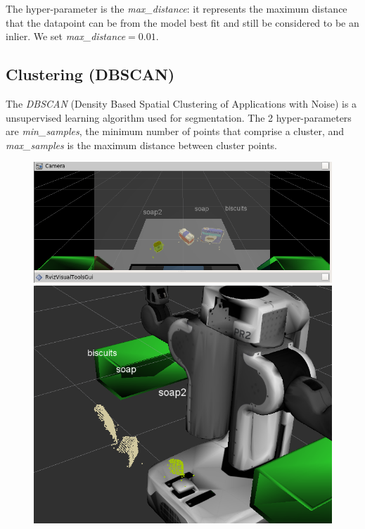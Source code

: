 \documentclass[a4paper,12pt]{report}
\begin{document}
\linespread{1.3}


The hyper-parameter is the \textit{max\_distance}: it represents the maximum distance that the datapoint can be from the model best fit and still be considered to be an inlier. We set \textit{max\_distance}$=0.01$.

\subsection{Clustering (DBSCAN)}
The \textit{DBSCAN} (Density Based Spatial Clustering of Applications with Noise) is a unsupervised learning algorithm used for segmentation. The 2 hyper-parameters are \textit{min\_samples}, the minimum number of points that comprise a cluster, and \textit{max\_samples} is the maximum distance between cluster points.

\begin{figure}[H]
\centering
        \includegraphics[totalheight=6cm]{imgs/cluster_1.png}
        \includegraphics[totalheight=6cm]{imgs/cluster_2.png}
\end{figure}
\end{document}
